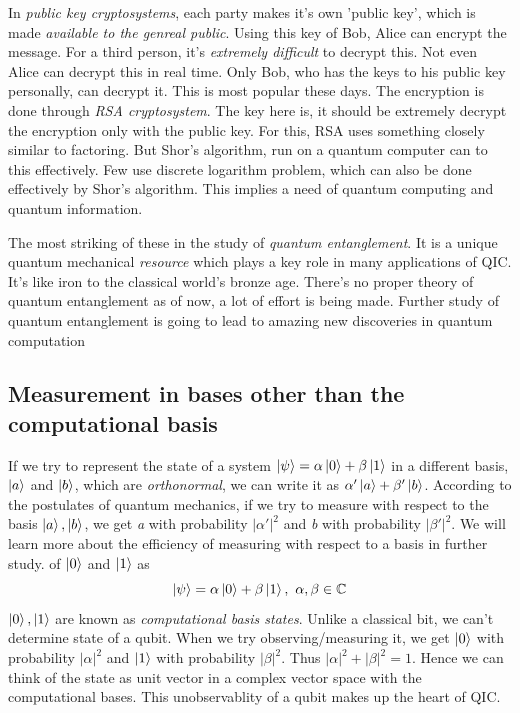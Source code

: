 In \textit{public key cryptosystems}, each party makes it's own 'public key', which is made \textit{available to the genreal public}. Using this key of Bob, Alice can encrypt the message. For a third person, it's \textit{extremely difficult} to decrypt this. Not even Alice can decrypt this in real time. Only Bob, who has the keys to his public key personally, can decrypt it. This is most popular these days. The encryption is done through \textit{RSA cryptosystem}. The key here is, it should be extremely decrypt the encryption only with the public key. For this, RSA uses something closely similar to factoring. But Shor's algorithm, run on a quantum computer can to this effectively. Few use discrete logarithm problem, which can also be done effectively by Shor's algorithm. This implies a need of quantum computing and quantum information.

The most striking of these in the study of \textit{quantum entanglement}. It is a unique quantum mechanical \textit{resource} which plays a key role in many applications of QIC. It's like iron to the classical world's bronze age. There's no proper theory of quantum entanglement as of now, a lot of effort is being made. Further study of quantum entanglement is going to lead to amazing new discoveries in quantum computation \subsection{Measurement in bases other than the computational basis}
If we try to represent the state of a system $\ket{\psi} = \alpha \ket{0} + \beta \ket{1}$ in a different basis, $\ket{a}$ and $\ket{b}$, which are \textit{orthonormal}, we can write it as $\alpha'\ket{a}+\beta'\ket{b}$. According to the postulates of quantum mechanics, if we try to measure with respect to the basis $\ket{a}, \ket{b}$, we get \textit{a} with probability $|\alpha'|^2$ and \textit{b} with probability $|\beta'|^2$. We will learn more about the efficiency of measuring with respect to a basis in further study. of $\ket{0}$ and $\ket{1}$ as \begin{equation}
    \ket{\psi} = \alpha \ket{0} + \beta \ket{1},\ \alpha,\beta \in \mathbb{C}
\end{equation}
$\ket{0}, \ket{1}$ are known as \textit{computational basis states}. Unlike a classical bit, we can't determine state of a qubit. When we try observing/measuring it, we get $\ket{0}$ with probability $|\alpha|^2$ and $\ket{1}$ with probability $|\beta|^2$. Thus $|\alpha|^2 + |\beta|^2 = 1$. Hence we can think of the state as unit vector in a complex vector space with the computational bases. This unobservablity of a qubit makes up the heart of QIC. 

